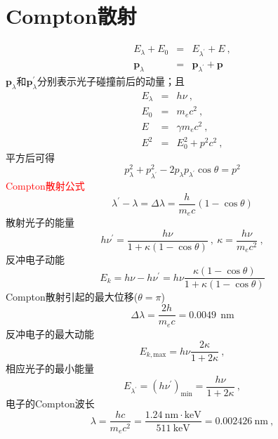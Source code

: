 \documentclass[12pt,a4paper]{article}
\renewcommand{\vec}[1]{\boldsymbol{#1}}
\begin{document}
\section{Compton散射}
\begin{eqnarray}
\nonumber E_{\lambda} + E_0 &=& E_{\lambda^{\prime}} +E ~, \\
\vec{p}_{\lambda} &=& \vec{p}_{\lambda^{\prime}} +\vec{p}
\end{eqnarray}
$\vec{p}_{\lambda}$和$\vec{p}_{\lambda}^{\prime}$分别表示光子碰撞前后的动量；且
\begin{eqnarray}
\nonumber E_{\lambda} &=& h\nu ~, \\
\nonumber E_0 &=& m_e c^2 ~, \\
\nonumber E &=& \gamma m_{e} c^2 ~, \\
E^2 &=& E_0^2 +p^2c^2 ~, 
\end{eqnarray}
平方后可得
\begin{equation}
p_{\lambda}^2 +p_{\lambda^{\prime}}^2 -2 p_{\lambda} p_{\lambda^{\prime}} \cos \theta = p^2
\end{equation}
\textcolor{red}{Compton散射公式}
\begin{equation}
\lambda^{\prime} -\lambda = \Delta \lambda = \frac{h}{m_e c} (1-\cos \theta)
\end{equation}
散射光子的能量
\begin{equation}
h\nu^{\prime} = \frac{h\nu}{1+\kappa (1-\cos \theta)} ~, ~\kappa = \frac{h\nu}{m_e c^2} ~, 
\end{equation}
反冲电子动能
\begin{equation}
E_k = h\nu -h\nu^{\prime} = h\nu \frac{\kappa(1-\cos \theta)}{1+\kappa (1-\cos \theta)}
\end{equation}
Compton散射引起的最大位移($\theta = \pi$)
\begin{equation}
\Delta \lambda = \frac{2h}{m_e c}  = 0.0049 ~~\text{nm}
\end{equation}
反冲电子的最大动能
\begin{equation}
E_{k, \text{max}} = h\nu \frac{2\kappa}{1+2\kappa} ~,
\end{equation}
相应光子的最小能量
\begin{equation}
E_{\lambda^{\prime}} = (h\nu^{\prime})_{\text{min}} = \frac{h\nu}{1+2\kappa} ~,
\end{equation}
电子的Compton波长
\begin{equation}
\lambda = \frac{hc}{m_e c^2} = \frac{1.24 ~\text{nm}\cdot \text{keV}}{511 ~\text{keV}} = 0.002426 ~\text{nm} ~,
\end{equation}
\end{document}
